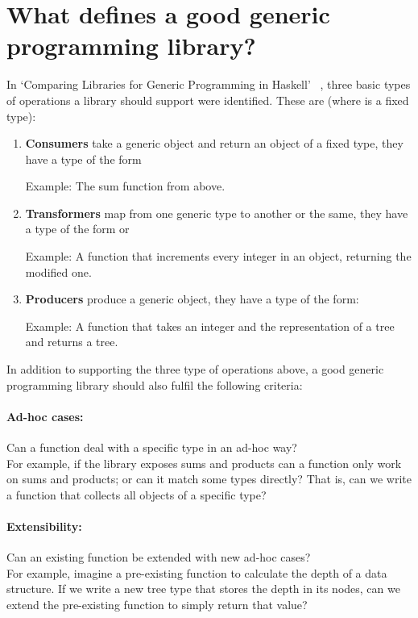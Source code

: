 \section*{What defines a good generic programming library?}
In `Comparing Libraries for Generic Programming in Haskell'~\cite{DBLP:conf/haskell/RodriguezJJGKO08}
, three basic types of operations a library should support were identified.
These are (where  is a fixed type):

\begin{enumerate}
    \item \textbf{Consumers} take a generic object and return an object of a fixed type, they have
           a type of the form 

           Example: The sum function from above.

    \item \textbf{Transformers} map from one generic type to another or the same, they have a type of the form
             or 

            Example: A function that increments every integer in an object, returning the modified one.

    \item \textbf{Producers} produce a generic object, they have a type of the form: 

            Example: A function that takes an integer and the representation of
                     a tree and returns a tree.
\end{enumerate}


In addition to supporting the three type of operations above, a good generic
programming library should also fulfil the following criteria:

\paragraph{Ad-hoc cases:} Can a function deal with a specific type in an ad-hoc way?
\\
For example, if the library exposes sums and products can a function
only work on sums and products; or can it match some types directly? That is,
can we write a function that collects all objects of a specific type?

\paragraph{Extensibility:} Can an existing function be extended with new ad-hoc cases?
\\
For example, imagine a pre-existing function to calculate the depth of a data
structure. If we write a new tree type that stores the depth in its nodes, can
we extend the pre-existing function to simply return that value?

